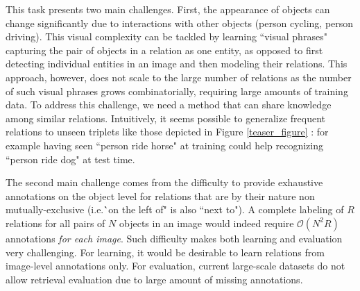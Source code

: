 \documentclass[10pt,twocolumn,letterpaper]{article}
\newcommand{\spaceparagraph}{\vspace{-.35cm}}
\newcommand{\gotoline}{\vspace{.05cm}}
\begin{document}

\gotoline
\vspace{4pt}
This task presents two main challenges. 
First, the appearance of objects can change significantly due to interactions with other objects (person cycling, person driving).
This visual complexity can be tackled by learning ``visual phrases"~\cite{Sadeghi2011} capturing the pair
of objects in a relation as one entity, as opposed to first detecting individual entities in an image and then modeling their relations. 
This approach, however, does not scale to the large number of relations as the number of such visual phrases grows combinatorially, requiring large amounts of training data.
To address this challenge, we need a method that can share knowledge among similar relations.
Intuitively, it seems possible to generalize frequent relations to unseen triplets like those depicted in Figure \ref{teaser_figure} : for example having seen ``person ride horse" at training could help recognizing ``person ride dog" at test time.

\gotoline
The second main challenge comes from the difficulty to provide exhaustive annotations on the object level for relations that are by their nature non mutually-exclusive (i.e.\``on the left of" is also ``next to"). A complete labeling of $R$ relations for all pairs of $N$ objects in an image would indeed require $\mathcal{O}(N^{2}R)$ annotations {\em for each image}. Such difficulty makes both learning and evaluation very challenging. For learning, it would be desirable to learn relations from image-level annotations only. For evaluation, current large-scale datasets \cite{Krishna2016,Lu16} do not allow retrieval evaluation due to large amount of missing annotations. 

\spaceparagraph
\end{document}

